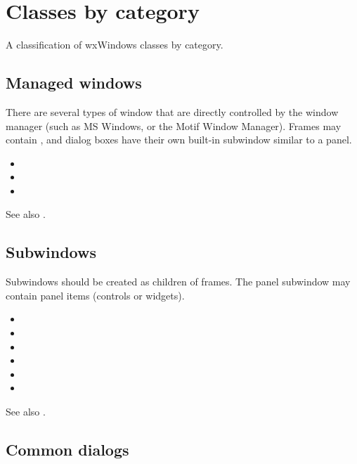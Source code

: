 \chapter{Classes by category}\label{classesbycat}
%
\setfooter{\thepage}{}{}{}{}{\thepage}%

A classification of wxWindows classes by category.

\section{Managed windows}

There are several types of window that are directly controlled by the
window manager (such as MS Windows, or the Motif Window Manager).
Frames may contain , and
dialog boxes have their own built-in subwindow similar to a panel.

\begin{itemize}\itemsep=0pt
\item {}
\item {}
\item {}
\end{itemize}

See also .

\section{Subwindows}\label{catsubwindows}

Subwindows should be created as children of frames. The panel
subwindow may contain panel items (controls or widgets).

\begin{itemize}\itemsep=0pt
\item {}
\item {}
\item {}
\item {}
\item {}
\item {}
\end{itemize}

See also .

\section{Common dialogs}\label{catcommondialogs}

